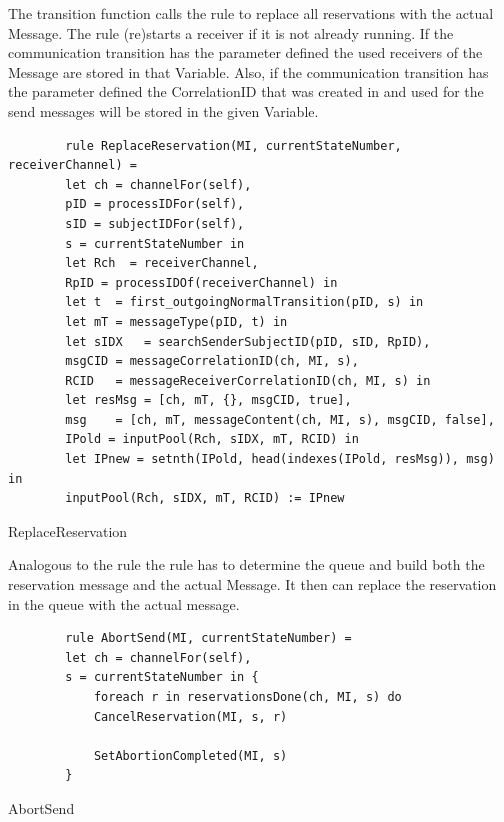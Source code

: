 The transition function calls the  rule to replace all
reservations with the actual Message. The  rule
(re)starts a receiver if it is not already running.
If the communication transition has the parameter  defined
the used receivers of the Message are stored in that Variable.
Also, if the communication transition has the parameter  defined
the CorrelationID that was created in  and used for the send messages will be stored in the given Variable.

\begin{listing}[H]
	\begin{verbatim}
		rule ReplaceReservation(MI, currentStateNumber, receiverChannel) =
		let ch = channelFor(self),
		pID = processIDFor(self),
		sID = subjectIDFor(self),
		s = currentStateNumber in
		let Rch  = receiverChannel,
		RpID = processIDOf(receiverChannel) in
		let t  = first_outgoingNormalTransition(pID, s) in
		let mT = messageType(pID, t) in
		let sIDX   = searchSenderSubjectID(pID, sID, RpID),
		msgCID = messageCorrelationID(ch, MI, s),
		RCID   = messageReceiverCorrelationID(ch, MI, s) in
		let resMsg = [ch, mT, {}, msgCID, true],
		msg    = [ch, mT, messageContent(ch, MI, s), msgCID, false],
		IPold = inputPool(Rch, sIDX, mT, RCID) in
		let IPnew = setnth(IPold, head(indexes(IPold, resMsg)), msg) in
		inputPool(Rch, sIDX, mT, RCID) := IPnew
	\end{verbatim}
	\caption{ReplaceReservation}
	\label{lst:shortasm:ReplaceReservation}
\end{listing}

Analogous to the  rule the
 rule has to determine the queue and build both
the reservation message and the actual Message. It then can replace the reservation
in the queue with the actual message.

\begin{listing}[H]
	\begin{verbatim}
		rule AbortSend(MI, currentStateNumber) =
		let ch = channelFor(self),
		s = currentStateNumber in {
			foreach r in reservationsDone(ch, MI, s) do
			CancelReservation(MI, s, r)
			
			SetAbortionCompleted(MI, s)
		}
	\end{verbatim}
	\caption{AbortSend}
	\label{lst:shortasm:AbortSend}
\end{listing}

